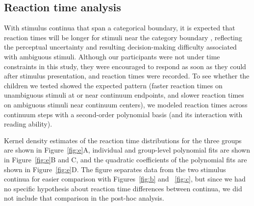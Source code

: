 \documentclass[../uwthesis.tex]{subfiles}
\begin{document}
\subsection{Reaction time analysis}
With stimulus continua that span a categorical boundary, it is expected that reaction times will be longer for stimuli near the category boundary \citep{Pisoni1974ReactionCategories,Repp1981PerceptualStimuli}, reflecting the perceptual uncertainty and resulting decision-making difficulty associated with ambiguous stimuli. Although our participants were not under time constraints in this study, they were encouraged to respond as soon as they could after stimulus presentation, and reaction times were recorded. To see whether the children we tested showed the expected pattern (faster reaction times on unambiguous stimuli at or near continuum endpoints, and slower reaction times on ambiguous stimuli near continuum centers), we modeled reaction times across continuum steps with a second-order polynomial basis (and its interaction with reading ability).

Kernel density estimates of the reaction time distributions for the three groups are shown in Figure~\ref{fig:e}A, individual and group-level polynomial fits are shown in Figure~\ref{fig:e}B and C, and the quadratic coefficients of the polynomial fits are shown in Figure~\ref{fig:e}D. The figure separates data from the two stimulus continua for easier comparison with Figures~\ref{fig:b} and ~\ref{fig:c}, but since we had no specific hypothesis about reaction time differences between continua, we did not include that comparison in the post-hoc analysis.
\end{document}
